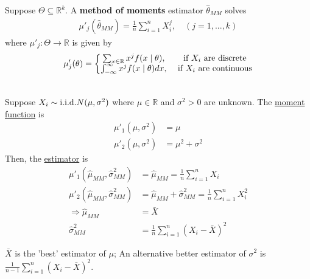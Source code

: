 \documentclass[11pt]{elegantbook}
\begin{document}
\begin{definition}
    \normalfont
    Suppose $\Theta\subseteq \mathbb{R}^k$. A \textbf{method of moments} estimator $\hat{\theta}_{MM}$ solves
    \begin{equation}
        \begin{aligned}
            \mu'_j(\hat{\theta}_{MM})=\frac{1}{n}\sum_{i=1}^n X_i^j,\quad (j=1,...,k)
        \end{aligned}
        \nonumber
    \end{equation}
    where $\mu'_j: \Theta \rightarrow \mathbb{R}$ is given by
    \begin{equation}
        \begin{aligned}
            \mu'_j(\theta)=\left\{\begin{matrix}
                \sum_{x\in \mathbb{R}}x^j f(x\mid \theta),& \textnormal{ if $X_i$ are discrete}\\
                \int_{-\infty}^\infty x^j f(x\mid \theta) dx,& \textnormal{ if $X_i$ are continuous}
            \end{matrix}\right.
        \end{aligned}
        \nonumber
    \end{equation}
\end{definition}
\begin{example}\quad\\
    Suppose $X_i\sim \textnormal{i.i.d.}N(\mu,\sigma^2)$ where $\mu\in \mathbb{R}$ and $\sigma^2>0$ are unknown. The \underline{moment function} is
    \begin{equation}
        \begin{aligned}
            \mu'_1(\mu,\sigma^2)&=\mu\\
            \mu'_2(\mu,\sigma^2)&=\mu^2+\sigma^2
        \end{aligned}
        \nonumber
    \end{equation}
    Then, the \underline{estimator} is
    \begin{equation}
        \begin{aligned}
            \mu'_1(\hat{\mu}_{MM},\hat{\sigma}^2_{MM})&=\hat{\mu}_{MM}=\frac{1}{n}\sum_{i=1}^n X_i\\
            \mu'_2(\hat{\mu}_{MM},\hat{\sigma}^2_{MM})&=\hat{\mu}_{MM}+\hat{\sigma}^2_{MM}=\frac{1}{n}\sum_{i=1}^n X_i^2\\
            \Rightarrow \hat{\mu}_{MM}&=\bar{X}\\
            \hat{\sigma}^2_{MM}&=\frac{1}{n}\sum_{i=1}^n (X_i-\bar{X})^2
        \end{aligned}
        \nonumber
    \end{equation}
    \begin{remark}
        $\bar{X}$ is the 'best' estimator of $\mu$; An alternative better estimator of $\sigma^2$ is $\frac{1}{n-1}\sum_{i=1}^n (X_i-\bar{X})^2$.
    \end{remark}
\end{example}
\end{document}
